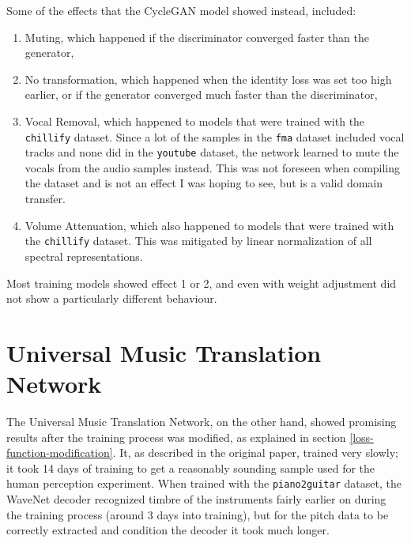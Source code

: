 \documentclass[12pt,a4paper,]{report}
\providecommand{\tightlist}{%
  \setlength{\itemsep}{0pt}\setlength{\parskip}{0pt}}
\begin{document}
Some of the effects that the CycleGAN model showed instead, included:

\begin{enumerate}
\def\labelenumi{\arabic{enumi}.}
\tightlist
\item
  Muting, which happened if the discriminator converged faster than the
  generator,
\item
  No transformation, which happened when the identity loss was set too
  high earlier, or if the generator converged much faster than the
  discriminator,
\item
  Vocal Removal, which happened to models that were trained with the
  \texttt{chillify} dataset. Since a lot of the samples in the
  \texttt{fma} dataset included vocal tracks and none did in the
  \texttt{youtube} dataset, the network learned to mute the vocals from
  the audio samples instead. This was not foreseen when compiling the
  dataset and is not an effect I was hoping to see, but is a valid
  domain transfer.
\item
  Volume Attenuation, which also happened to models that were trained
  with the \texttt{chillify} dataset. This was mitigated by linear
  normalization of all spectral representations.
\end{enumerate}

Most training models showed effect 1 or 2, and even with weight
adjustment did not show a particularly different behaviour.

\hypertarget{universal-music-translation-network-2}{%
\section{Universal Music Translation
Network}\label{universal-music-translation-network-2}}

The Universal Music Translation Network, on the other hand, showed
promising results after the training process was modified, as explained
in section \ref{loss-function-modification}. It, as described in the
original paper, trained very slowly; it took 14 days of training to get
a reasonably sounding sample used for the human perception experiment.
When trained with the \texttt{piano2guitar} dataset, the WaveNet decoder
recognized timbre of the instruments fairly earlier on during the
training process (around 3 days into training), but for the pitch data
to be correctly extracted and condition the decoder it took much longer.
\end{document}
